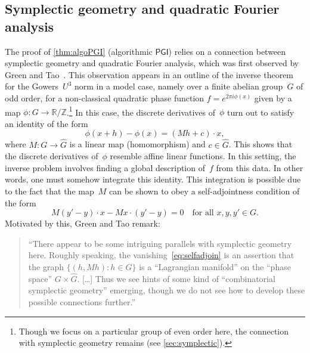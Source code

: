 \documentclass[11pt]{amsart}
\newcommand{\R}{\mathbb{R}} %
\newcommand{\Z}{\mathbb{Z}} %
\newcommand{\PGI}{\textsf{PGI}}
\theoremstyle{plain}
\theoremstyle{definition}
\theoremstyle{remark}
\begin{document}
\subsection{Symplectic geometry and quadratic Fourier analysis}

The proof of \cref{thm:algoPGI} (algorithmic $\PGI$) relies on a connection between symplectic geometry and quadratic Fourier analysis, which was first observed by Green and Tao~\cite{GreenTao2008}.
This observation appears in an outline of the inverse theorem for the Gowers~$U^3$ norm in a model case, namely over a finite abelian group~$G$ of odd order, for a non-classical quadratic phase function $f = e^{2\pi i\phi(x)}$ given by a map $\phi:G\to \R/\Z$.\footnote{
Though we focus on a particular group of even order here, the connection with symplectic geometry remains (see \cref{sec:symplectic}).}
In this case, the discrete derivatives of~$\phi$ turn out to satisfy an identity of the form
\begin{equation*}
    \phi(x+h) - \phi(x) =  ( Mh + c)\cdot x,
\end{equation*}
where $M:G \to \widehat{G}$ is a linear map (homomorphism) and $c\in \widehat{G}$.
This shows that the discrete derivatives of~$\phi$ resemble affine linear functions.
In this setting, the inverse problem involves finding a global description of~$f$ from this data. In other words, one must somehow integrate this identity.
This integration is possible  due to the fact that the map~$M$ can be shown to obey a self-adjointness condition of the form
\begin{equation}\label{eq:selfadjoin}
    M(y'-y)\cdot x -  Mx\cdot (y'-y)=0
    \quad
    \text{for all $x,y,y'\in G$.}
\end{equation}
Motivated by this, Green and Tao remark:

\begin{quote}
    ``There appear to be some intriguing parallels with symplectic geometry here.
    Roughly speaking, the vanishing~\eqref{eq:selfadjoin} is an assertion that the graph $\{(h,Mh) : h\in G\}$ is a ``Lagrangian manifold'' on the ``phase space'' $G\times \widehat{G}$. [\dots] Thus we see hints of some kind of ``combinatorial symplectic geometry'' emerging, though we do not see how to develop these possible connections further.''
\end{quote}
\end{document}
